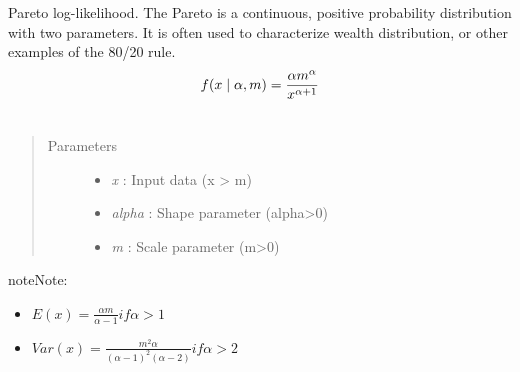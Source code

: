 \documentclass[letterpaper,10pt,english]{sphinxmanual}
\begin{document}
\begin{fulllineitems}
\label{distributions:pymc.distributions.pareto_like}
Pareto log-likelihood. The Pareto is a continuous, positive 
probability distribution with two parameters. It is often used
to characterize wealth distribution, or other examples of the
80/20 rule.
\begin{gather}
\begin{split}f(x \mid \alpha, m) = \frac{\alpha m^{\alpha}}{x^{\alpha+1}}\end{split}\notag\\\begin{split}\end{split}\notag
\end{gather}\begin{quote}\begin{description}
\item[{Parameters }] \leavevmode\begin{itemize}
\item {} 
\emph{x} : Input data (x \textgreater{} m)

\item {} 
\emph{alpha} : Shape parameter (alpha\textgreater{}0)

\item {} 
\emph{m} : Scale parameter (m\textgreater{}0)

\end{itemize}

\end{description}\end{quote}

\begin{notice}{note}{Note:}\begin{itemize}
\item {} 
$E(x)=\frac{\alpha m}{\alpha-1} if \alpha > 1$

\item {} 
$Var(x)=\frac{m^2 \alpha}{(\alpha-1)^2(\alpha-2)} if \alpha > 2$

\end{itemize}
\end{notice}

\end{fulllineitems}

\end{document}
